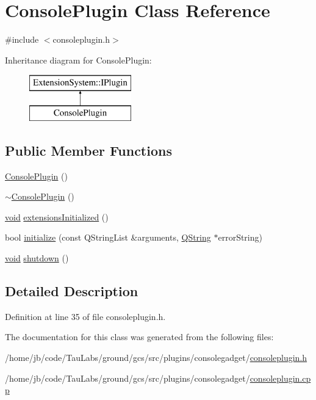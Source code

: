 \hypertarget{class_console_plugin}{\section{\-Console\-Plugin \-Class \-Reference}
\label{class_console_plugin}
}


{\ttfamily \#include $<$consoleplugin.\-h$>$}

\-Inheritance diagram for \-Console\-Plugin\-:\begin{figure}[H]
\begin{center}
\leavevmode
\includegraphics[height=2.000000cm]{class_console_plugin}
\end{center}
\end{figure}
\subsection*{\-Public \-Member \-Functions}
\begin{DoxyCompactItemize}
\item 
\hyperlink{group___console_plugin_ga1200bf1b46402c602901b2444d697eb9}{\-Console\-Plugin} ()
\item 
\hyperlink{group___console_plugin_ga052ccde553f4cd9ef381d5035141b863}{$\sim$\-Console\-Plugin} ()
\item 
\hyperlink{group___u_a_v_objects_plugin_ga444cf2ff3f0ecbe028adce838d373f5c}{void} \hyperlink{group___console_plugin_ga85a6a6c06db877c20f7a07d780d8b475}{extensions\-Initialized} ()
\item 
bool \hyperlink{group___console_plugin_ga16272a47e2f07a68477d2c8c949dd1a7}{initialize} (const \-Q\-String\-List \&arguments, \hyperlink{group___u_a_v_objects_plugin_gab9d252f49c333c94a72f97ce3105a32d}{\-Q\-String} $\ast$error\-String)
\item 
\hyperlink{group___u_a_v_objects_plugin_ga444cf2ff3f0ecbe028adce838d373f5c}{void} \hyperlink{group___console_plugin_gaa3ff74c08dc36f2a1ba79357ab45319a}{shutdown} ()
\end{DoxyCompactItemize}


\subsection{\-Detailed \-Description}


\-Definition at line 35 of file consoleplugin.\-h.



\-The documentation for this class was generated from the following files\-:\begin{DoxyCompactItemize}
\item 
/home/jb/code/\-Tau\-Labs/ground/gcs/src/plugins/consolegadget/\hyperlink{consoleplugin_8h}{consoleplugin.\-h}\item 
/home/jb/code/\-Tau\-Labs/ground/gcs/src/plugins/consolegadget/\hyperlink{consoleplugin_8cpp}{consoleplugin.\-cpp}\end{DoxyCompactItemize}
